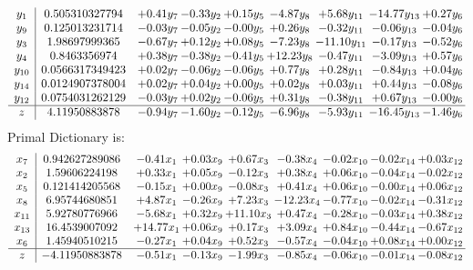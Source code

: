 \documentclass[8pt]{article}
\begin{document}
\[\begin{array}{c| c c@{\hskip 2pt} c@{\hskip 2pt} c@{\hskip 2pt} c@{\hskip 2pt} c@{\hskip 2pt} c@{\hskip 2pt} c@{\hskip 2pt} }
 y_{1}   &  0.505310327794 & +  0.41 y_{7} & -0.33 y_{2} & +  0.15 y_{5} & -4.87 y_{8} & +  5.68 y_{11} & -14.77 y_{13} & +  0.27 y_{6}\\
 y_{9}   &  0.125013231714 & -0.03 y_{7} & -0.05 y_{2} & -0.00 y_{5} & +  0.26 y_{8} & -0.32 y_{11} & -0.06 y_{13} & -0.04 y_{6}\\
 y_{3}   &  1.98697999365 & -0.67 y_{7} & +  0.12 y_{2} & +  0.08 y_{5} & -7.23 y_{8} & -11.10 y_{11} & -0.17 y_{13} & -0.52 y_{6}\\
 y_{4}   &  0.8463356974 & +  0.38 y_{7} & -0.38 y_{2} & -0.41 y_{5} & + 12.23 y_{8} & -0.47 y_{11} & -3.09 y_{13} & +  0.57 y_{6}\\
 y_{10}   &  0.0566317349423 & +  0.02 y_{7} & -0.06 y_{2} & -0.06 y_{5} & +  0.77 y_{8} & +  0.28 y_{11} & -0.84 y_{13} & +  0.04 y_{6}\\
 y_{14}   &  0.0124907378004 & +  0.02 y_{7} & +  0.04 y_{2} & +  0.00 y_{5} & +  0.02 y_{8} & +  0.03 y_{11} & +  0.44 y_{13} & -0.08 y_{6}\\
 y_{12}   &  0.0754031262129 & -0.03 y_{7} & +  0.02 y_{2} & -0.06 y_{5} & +  0.31 y_{8} & -0.38 y_{11} & +  0.67 y_{13} & -0.00 y_{6}\\
\hline
z    &  4.11950883878 & -0.94 y_{7} & -1.60 y_{2} & -0.12 y_{5} & -6.96 y_{8} & -5.93 y_{11} & -16.45 y_{13} & -1.46 y_{6}\\
\end{array}\]
Primal Dictionary is:
\[\begin{array}{c| c c@{\hskip 2pt} c@{\hskip 2pt} c@{\hskip 2pt} c@{\hskip 2pt} c@{\hskip 2pt} c@{\hskip 2pt} c@{\hskip 2pt} }
 x_{7}   &  0.942627289086 & -0.41 x_{1} & +  0.03 x_{9} & +  0.67 x_{3} & -0.38 x_{4} & -0.02 x_{10} & -0.02 x_{14} & +  0.03 x_{12}\\
 x_{2}   &  1.59606224198 & +  0.33 x_{1} & +  0.05 x_{9} & -0.12 x_{3} & +  0.38 x_{4} & +  0.06 x_{10} & -0.04 x_{14} & -0.02 x_{12}\\
 x_{5}   &  0.121414205568 & -0.15 x_{1} & +  0.00 x_{9} & -0.08 x_{3} & +  0.41 x_{4} & +  0.06 x_{10} & -0.00 x_{14} & +  0.06 x_{12}\\
 x_{8}   &  6.95744680851 & +  4.87 x_{1} & -0.26 x_{9} & +  7.23 x_{3} & -12.23 x_{4} & -0.77 x_{10} & -0.02 x_{14} & -0.31 x_{12}\\
 x_{11}   &  5.92780776966 & -5.68 x_{1} & +  0.32 x_{9} & + 11.10 x_{3} & +  0.47 x_{4} & -0.28 x_{10} & -0.03 x_{14} & +  0.38 x_{12}\\
 x_{13}   &  16.4539007092 & + 14.77 x_{1} & +  0.06 x_{9} & +  0.17 x_{3} & +  3.09 x_{4} & +  0.84 x_{10} & -0.44 x_{14} & -0.67 x_{12}\\
 x_{6}   &  1.45940510215 & -0.27 x_{1} & +  0.04 x_{9} & +  0.52 x_{3} & -0.57 x_{4} & -0.04 x_{10} & +  0.08 x_{14} & +  0.00 x_{12}\\
\hline
z    &  -4.11950883878 & -0.51 x_{1} & -0.13 x_{9} & -1.99 x_{3} & -0.85 x_{4} & -0.06 x_{10} & -0.01 x_{14} & -0.08 x_{12}\\
\end{array}\]
\end{document}
